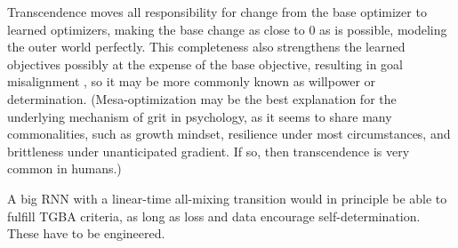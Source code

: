 \documentclass{article}
\begin{document}
Transcendence moves all responsibility for change from the base optimizer to learned optimizers, making the base change as close to 0 as is possible, modeling the outer world perfectly. This completeness also strengthens the learned objectives possibly at the expense of the base objective, resulting in goal misalignment \cite{hubinger2019risks}, so it may be more commonly known as willpower or determination. (Mesa-optimization may be the best explanation for the underlying mechanism of grit \cite{Kannangara2018AllTG} in psychology, as it seems to share many commonalities, such as growth mindset, resilience under most circumstances, and brittleness under unanticipated gradient. If so, then transcendence is very common in humans.)

A big RNN with a linear-time all-mixing transition would in principle be able to fulfill TGBA criteria, as long as loss and data encourage self-determination. These have to be engineered.
\end{document}
